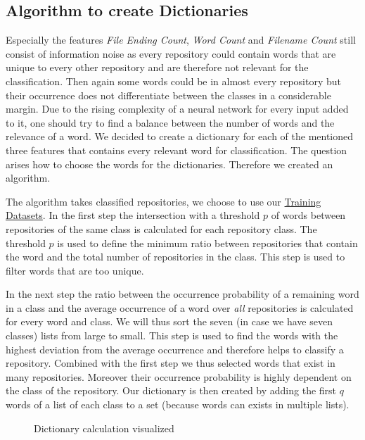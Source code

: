 \documentclass[paper=A4,pagesize=auto,12pt,headinclude=true,footinclude=true,BCOR=0mm,DIV=calc]{scrartcl}
\begin{document}
	\subsection{Algorithm to create Dictionaries}
	Especially the features \textit{File Ending Count}, \textit{Word Count} and\textit{ Filename Count} still consist of information noise as every repository could contain words that are unique to every other repository and are therefore not relevant for the classification. Then again some words could be in almost every repository but their occurrence does not differentiate between the classes in a considerable margin. Due to the rising complexity of a neural network for every input added to it, one should try to find a balance between the number of words and the relevance of a word. We decided to create a dictionary for each of the mentioned three features that contains every relevant word for classification.
	The question arises how to choose the words for the dictionaries. Therefore we created an algorithm.
	
	The algorithm takes classified repositories, we choose to use our \hyperref[src:Repositories]{Training Datasets}.
	In the first step the intersection with a threshold $p$ of words between repositories of the same class is calculated for each repository class. The threshold $p$ is used to define the minimum ratio between repositories that contain the word and the total number of repositories in the class. 
	This step is used to filter words that are too unique.
	
	In the next step the ratio between the occurrence probability of a remaining word in a class and the average occurrence of a word over \textit{all} repositories is calculated for every word and class. We will thus sort the seven (in case we have seven classes) lists from large to small. This step is used to find the words with the highest deviation from the average occurrence and therefore helps to classify a repository. Combined with the first step we thus selected words that exist in many repositories. Moreover their occurrence probability is highly dependent on the class of the repository.
	Our dictionary is then created by adding the first $q$ words of a list of each class to a set (because words can exists in multiple lists).
	\begin{figure}[H]
		\caption{Dictionary calculation visualized}
	\end{figure}
	
\end{document}
